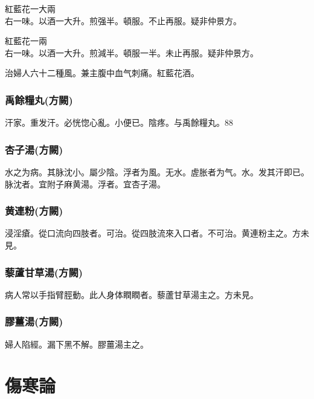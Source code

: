 紅藍花{\scriptsize 一大兩}\\
右一味。以酒一大升。煎强半。頓服。不止再服。{\scriptsize 疑非仲景方。}{\wuben}

紅藍花{\scriptsize 一兩}\\
右一味。以酒一大升。煎減半。頓服一半。未止再服。{\scriptsize 疑非仲景方。}{\dengben}

治婦人六十二種風。兼主腹中血气刺痛。紅藍花酒。

\section{禹餘糧丸{\scriptsize (方闕)}}

汗家。重发汗。必恍惚心亂。小便已。陰疼。与禹餘糧丸。88

\section{杏子湯{\scriptsize (方闕)}}

水之为病。其脉沈小。屬少陰。浮者为風。无水。虗胀者为气。水。发其汗即已。脉沈者。宜附子麻黄湯。浮者。宜杏子湯。

\section{黄連粉{\scriptsize (方闕)}}

浸淫瘡。從口流向四肢者。可治。從四肢流來入口者。不可治。黄連粉主之。{\scriptsize 方未見。}

\section{藜蘆甘草湯{\scriptsize (方闕)}}

病人常以手指臂脛動。此人身体瞤瞤者。藜蘆甘草湯主之。{\scriptsize 方未見。}

\section{膠薑湯{\scriptsize (方闕)}}

婦人陷經。漏下黑不解。膠薑湯主之。

\part{傷寒論}


